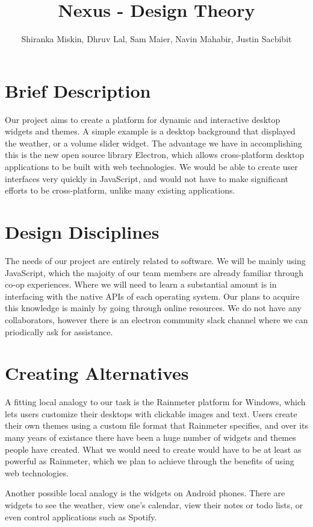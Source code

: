 \documentclass[11pt, oneside]{article}   	%
\title{Nexus - Design Theory}
\author{Shiranka Miskin, Dhruv Lal, Sam Maier, Navin Mahabir, Justin Sacbibit}
\begin{document}
\maketitle
\section {Brief Description}
Our project aims to create a platform for dynamic and interactive desktop
widgets and themes.  A simple example is a desktop background that displayed the
weather, or a volume slider widget.  The advantage we have in accomplishing this
is the new open source library Electron, which allows cross-platform desktop
applications to be built with web technologies.  We would be able to create user
interfaces very quickly in JavaScript, and would not have to make significant
efforts to be cross-platform, unlike many existing applications.

\section{Design Disciplines}
The needs of our project are entirely related to software.  We will be mainly
using JavaScript, which the majoity of our team members are already familiar
through co-op experiences.  Where we will need to learn a substantial amount is
in interfacing with the native APIs of each operating system.  Our plans to
acquire this knowledge is mainly by going through online resources.  We do not
have any collaborators, however there is an electron community slack channel
where we can priodically ask for assistance.

\section{Creating Alternatives}
A fitting local analogy to our task is the Rainmeter platform for Windows, which
lets users customize their desktops with clickable images and text.  Users
create their own themes using a custom file format that Rainmeter specifies, and
over its many years of existance there have been a huge number of widgets and
themes people have created.  What we would need to create would have to be at
least as powerful as Rainmeter, which we plan to achieve through the benefits of
using web technologies.

Another possible local analogy is the widgets on Android phones.  There are
widgets to see the weather, view one's calendar, view their notes or todo lists,
or even control applications such as Spotify.
\end{document}
